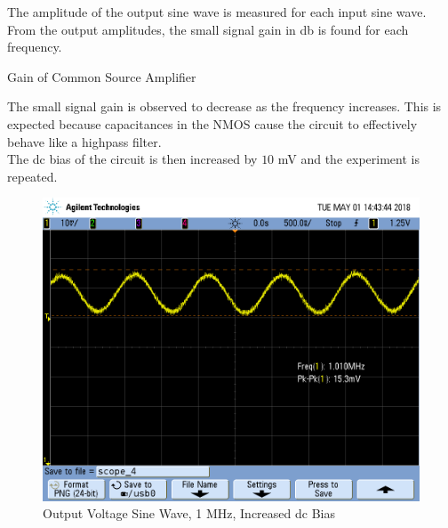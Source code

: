 \FloatBarrier

The amplitude of the output sine wave is measured for each input sine wave. 
From the output amplitudes, the small signal gain in \si{\decibel} is found for each frequency.

\FloatBarrier

\begin{table}[h!]
	\centering
	\caption{Gain of Common Source Amplifier}
	\label{tab:gain_part2}
\end{table}

\FloatBarrier

The small signal gain is observed to decrease as the frequency increases.
This is expected because capacitances in the NMOS cause the circuit to effectively behave like a highpass filter. \\

The dc bias of the circuit is then increased by $10$ \si{\milli\volt} and the experiment is repeated.

\FloatBarrier

\begin{figure}[h!]
	\centering
	\includegraphics[scale=0.3]{../images/SCOPE_4.PNG}
	\caption{Output Voltage Sine Wave, 1 \si{\mega\hertz}, Increased dc Bias}
	\label{fig:1mhz_original}
\end{figure}

\FloatBarrier


